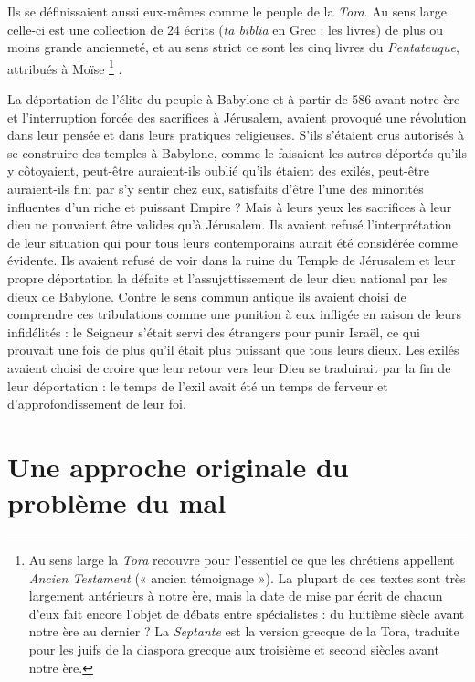 Ils se définissaient aussi eux-mêmes comme le peuple de la \emph{Tora}. Au sens large celle-ci est une collection de 24 écrits (\emph{ta biblia} en Grec : les livres) de plus ou moins grande ancienneté, et au sens strict ce sont les cinq livres du \emph{Pentateuque}, attribués à Moïse%
\footnote{Au sens large la \emph{Tora} recouvre pour l'essentiel ce que les chrétiens appellent \emph{Ancien Testament} (« ancien témoignage »). La plupart de ces textes sont très largement antérieurs à notre ère, mais la date de mise par écrit de chacun d'eux fait encore l'objet de débats entre spécialistes : du huitième siècle avant notre ère au dernier ? La \emph{Septante} est la version grecque de la Tora, traduite pour les juifs de la diaspora grecque aux troisième et second siècles avant notre ère.}%
.

 La déportation de l'élite du peuple à Babylone et à partir de 586 avant notre ère et l'interruption forcée des sacrifices à Jérusalem, avaient provoqué une révolution dans leur pensée et dans leurs pratiques religieuses. S'ils s'étaient crus autorisés à se construire des temples à Babylone, comme le faisaient les autres déportés qu'ils y côtoyaient, peut-être auraient-ils oublié qu'ils étaient des exilés, peut-être auraient-ils fini par s'y sentir chez eux, satisfaits d'être l'une des minorités influentes d'un riche et puissant Empire ? Mais à leurs yeux les sacrifices à leur dieu ne pouvaient être valides qu'à Jérusalem. Ils avaient refusé l'interprétation de leur situation qui pour tous leurs contemporains aurait été considérée comme évidente. Ils avaient refusé de voir dans la ruine du Temple de Jérusalem et leur propre déportation la défaite et l'assujettissement de leur dieu national par les dieux de Babylone. Contre le sens commun antique ils avaient choisi de comprendre ces tribulations comme une punition à eux infligée en raison de leurs infidélités : le Seigneur s'était servi des étrangers pour punir Israël, ce qui prouvait une fois de plus qu'il était plus puissant que tous leurs dieux. Les exilés avaient choisi de croire que leur retour vers leur Dieu se traduirait par la fin de leur déportation : le temps de l'exil avait été un temps de ferveur et d'approfondissement de leur foi. 

\section{Une approche originale du problème du mal}

